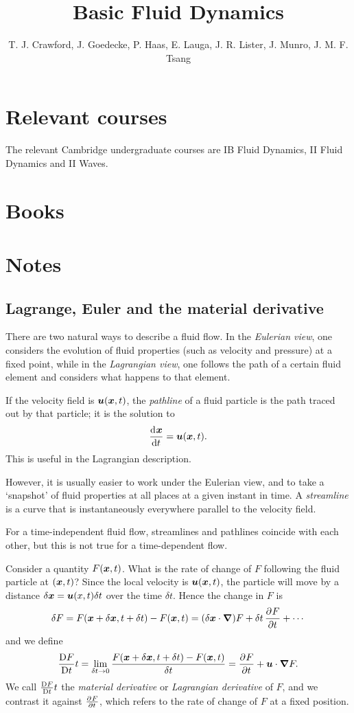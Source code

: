 \documentclass{article}
\title{Basic Fluid Dynamics}
\author{T. J. Crawford, J. Goedecke, P. Haas, E. Lauga, J. R. Lister, J. Munro, J. M. F. Tsang}
\begin{document}
\maketitle

\section{Relevant courses}

The relevant Cambridge undergraduate courses are IB Fluid Dynamics, II Fluid
Dynamics and II Waves. 

\section{Books}

\section{Notes}

\subsection{Lagrange, Euler and the material derivative}

There are two natural ways to describe a fluid flow. In the \textit{Eulerian
view}, one considers the evolution of fluid properties (such as velocity and
pressure) at a fixed point, while in the \textit{Lagrangian view}, one follows
the path of a certain fluid element and considers what happens to that element.

If the velocity field is $\boldsymbol{u}(\boldsymbol{x},t)$, the \textit{pathline} of a fluid
particle is the path traced out by that particle; it is the solution to 
$$ \dod{\bs{x}}{t} = \bs{u}(\bs{x},t). $$
This is useful in the Lagrangian description.

However, it is usually easier to work under the Eulerian view, and to take a
`snapshot' of fluid properties at all places at a given instant in time. A
\textit{streamline} is a curve that is instantaneously everywhere parallel to
the velocity field. 

For a time-independent fluid flow, streamlines and pathlines coincide with each
other, but this is not true for a time-dependent flow.

Consider a quantity $F(\boldsymbol{x},t)$.  What is the rate of change
of $F$ following the fluid particle at $(\boldsymbol{x},t)$? Since the local velocity is
$\boldsymbol{u}(\boldsymbol{x},t)$, the particle will move by a distance
$\delta\boldsymbol{x}=\boldsymbol{u}(x,t) \delta t$ over the time $\delta t$. Hence the change
in $F$ is
$$ \delta F = F(\bs{x}+\delta\bs{x},t+\delta t) - F(\bs{x},t)
     = (\delta\bs{x}\cdot\grad)F + \delta t \dpd{F}{t} + \cdots $$
and we define 
$$ \DDt{F}{t} = \lim_{\delta t\rightarrow0} 
 \frac{F(\bs{x}+\delta\bs{x},t+\delta t) - F(\bs{x},t)}{\delta t} 
 = \dpd{F}{t} + \bs{u}\cdot\grad F. $$
We call $\frac{\mathrm{D}F}{\mathrm{D}t}{t}$ the \textit{material derivative} or \textit{Lagrangian
derivative} of $F$, and we contrast it against $\pd{F}{t}$, which refers to the rate
of change of $F$ at a fixed position.
\end{document}
